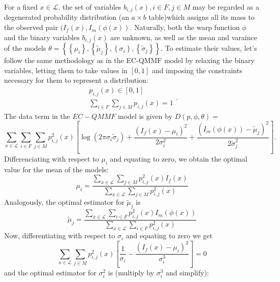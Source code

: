 \documentclass[11pt]{article}
\begin{document}
For a fixed $x\in \mathcal{L}$, the set of variables $b_{i,j}(x), i\in F, j\in M$ may be regarded as a degenerated probability distribution (an $a\times b$ table)which assigns all its mass to the observed pair $(I_f(x), I_m(\phi(x))$. Naturally, both the warp function $\phi$ and the binary variables $b_{i,j}(x)$ are unknown, as well as the mean and varaince of the models $\theta = \left\lbrace \left\lbrace \mu_i\right\rbrace, \left\lbrace \tilde{\mu}_j\right\rbrace, \left\lbrace \sigma_i\right\rbrace, \left\lbrace \tilde{\sigma}_j\right\rbrace \right\rbrace$. To estimate their values, let's follow the same methodology as in the EC-QMMF model by relaxing the binary variables, letting them to take values in $[0,1]$ and imposing the constraints necessary for them to represent a distribution:
\begin{equation}
	\begin{array}{l}
		p_{i,j}(x)\in [0,1]\\
		\sum_{i\in F}\sum_{j\in M}p_{i,j}(x)=1
	\end{array}.
\end{equation}
The data term in the $EC-QMMF$ model is given by $D(p, \phi, \theta)=$
\begin{equation}
	\sum_{x \in\mathcal{L}}\sum_{i\in F}\sum_{j\in M}p_{i,j}^2(x)\left[\log(2\pi\sigma_{i}\tilde{\sigma}_j)+
	\frac{\left(I_{f}(x) - \mu_{i}\right)^2}{2\sigma_{i}^2}
	+ \frac{\left(I_{m}(\phi(x)) - \tilde{\mu}_{j}\right)^2}{2\tilde{\sigma}_{j}^2}
	\right].
\end{equation}
Differenciating with respect to $\mu_i$ and equating to zero, we obtain the optimal value for the mean of the models:
\begin{equation}
	\mu_i=\frac{\sum_{x\in\mathcal{L}}\sum_{j\in M}p_{i,j}^{2}(x)I_{f}(x)}{\sum_{x\in\mathcal{L}}\sum_{j\in M}p_{i,j}^{2}(x)}
\end{equation}
Analogously, the optimal estimator for $\tilde{\mu}_j$ is
\begin{equation}
	\tilde{\mu}_j=\frac{\sum_{x\in\mathcal{L}}\sum_{i\in F}p_{i,j}^{2}(x)I_{m}(\phi(x))}{\sum_{x\in\mathcal{L}}\sum_{i\in F}p_{i,j}^{2}(x)}
\end{equation}
Now, differentiating with respect to $\sigma_i$ and equating to zero we get
\begin{equation}
	\sum_{x \in\mathcal{L}}\sum_{j\in M}p_{i,j}^{2}(x)\left[
	\frac{1}{\sigma_i}-\frac{(I_{f}(x) - \mu_i)^2}{\sigma_{i}^3} \right]=0
\end{equation}
and the optimal estimator for $\sigma_i^{2}$ is (multiply by $\sigma_i^{3}$ and simplify):
\end{document}
